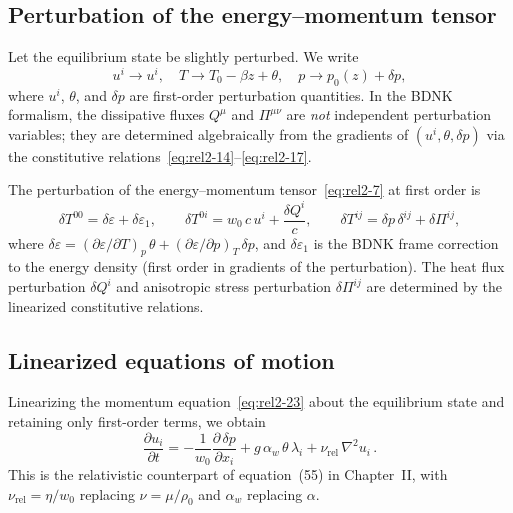 \subsection{Perturbation of the energy--momentum tensor}\label{sec:rel9b}

Let the equilibrium state be slightly perturbed.  We write
\begin{equation}
\label{eq:rel2-29}
  u^i \to u^i, \quad T \to T_0 - \beta z + \theta, \quad
  p \to p_0(z) + \delta p,
\end{equation}
where $u^i$, $\theta$, and $\delta p$ are first-order perturbation
quantities.  In the BDNK formalism, the dissipative fluxes $Q^\mu$ and
$\Pi^{\mu\nu}$ are \emph{not} independent perturbation variables; they are
determined algebraically from the gradients of $(u^i, \theta, \delta p)$
via the constitutive relations~\eqref{eq:rel2-14}--\eqref{eq:rel2-17}.

The perturbation of the energy--momentum tensor~\eqref{eq:rel2-7}
at first order is
\begin{equation}
\label{eq:rel2-30}
  \delta T^{00} = \delta\varepsilon + \delta\varepsilon_1, \qquad
  \delta T^{0i} = w_0\,c\,u^i + \frac{\delta Q^i}{c}, \qquad
  \delta T^{ij} = \delta p\,\delta^{ij} + \delta\Pi^{ij},
\end{equation}
where $\delta\varepsilon = (\partial\varepsilon/\partial T)_p\,\theta
+ (\partial\varepsilon/\partial p)_T\,\delta p$, and
$\delta\varepsilon_1$ is the BDNK frame correction to the energy density
(first order in gradients of the perturbation).  The heat flux perturbation
$\delta Q^i$ and anisotropic stress perturbation $\delta\Pi^{ij}$ are
determined by the linearized constitutive relations.

\subsection{Linearized equations of motion}\label{sec:rel9c}

Linearizing the momentum equation~\eqref{eq:rel2-23} about the equilibrium
state and retaining only first-order terms, we obtain
\begin{equation}
\label{eq:rel2-31}
  \frac{\partial u_i}{\partial t}
  = -\frac{1}{w_0}\frac{\partial\,\delta p}{\partial x_i}
    + g\,\alpha_w\,\theta\,\lambda_i
    + \nu_{\mathrm{rel}}\,\nabla^2 u_i\,.
\end{equation}
This is the relativistic counterpart of equation~(55) in Chapter~II,
with $\nu_{\mathrm{rel}} = \eta/w_0$ replacing $\nu = \mu/\rho_0$ and
$\alpha_w$ replacing $\alpha$.

